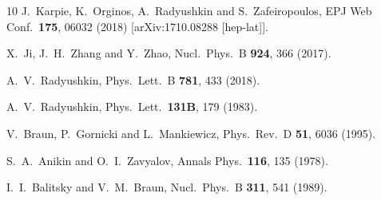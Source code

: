 \begin{thebibliography}{10}
  J.~Karpie, K.~Orginos, A.~Radyushkin and S.~Zafeiropoulos,
  EPJ Web Conf.\  {\bf 175}, 06032 (2018)
  [arXiv:1710.08288 [hep-lat]].


  X.~Ji, J.~H.~Zhang and Y.~Zhao,
  Nucl.\ Phys.\ B {\bf 924}, 366 (2017).



  A.~V.~Radyushkin,
  Phys.\ Lett.\ B {\bf 781}, 433 (2018).


  A.~V.~Radyushkin,
  Phys.\ Lett.\  {\bf 131B}, 179 (1983).


  V.~Braun, P.~Gornicki and L.~Mankiewicz,
  Phys.\ Rev.\ D {\bf 51}, 6036 (1995).


  S.~A.~Anikin and O.~I.~Zavyalov,
  Annals Phys.\  {\bf 116}, 135 (1978).


  I.~I.~Balitsky and V.~M.~Braun,
  Nucl.\ Phys.\ B {\bf 311}, 541 (1989).



\end{thebibliography}
